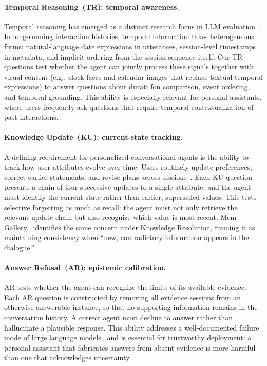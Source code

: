 \documentclass{llmxive}
\begin{document}
\paragraph{Temporal Reasoning~(TR): temporal awareness.}
Temporal reasoning has emerged as a distinct research focus in LLM evaluation~\cite{wang2023cola,wang2022subeventwriter,wei2025time,wu2025longmemevalbenchmarkingchatassistants}. In long-running interaction histories, temporal information takes heterogeneous forms: natural-language date expressions in utterances, session-level timestamps in metadata, and implicit ordering from the session sequence itself. Our TR questions test whether the agent can jointly process these signals together with visual content (e.g., clock faces and calendar images that replace textual temporal expressions) to answer questions about durati fon comparison, event ordering, and temporal grounding. This ability is especially relevant for personal assistants, where users frequently ask questions that require temporal contextualization of past interactions.

\paragraph{Knowledge Update~(KU): current-state tracking.}
A defining requirement for personalized conversational agents is the ability to track how user attributes evolve over time. Users routinely update preferences, correct earlier statements, and revise plans across sessions~\cite{xu2024knowledge}. Each KU question presents a chain of four successive updates to a single attribute, and the agent must identify the current state rather than earlier, superseded values. This tests selective forgetting as much as recall: the agent must not only retrieve the relevant update chain but also recognize which value is most recent. Mem-Gallery~\cite{memgallery} identifies the same concern under Knowledge Resolution, framing it as maintaining consistency when ``new, contradictory information appears in the dialogue.''

\paragraph{Answer Refusal~(AR): epistemic calibration.}
AR tests whether the agent can recognize the limits of its available evidence. Each AR question is constructed by removing all evidence sessions from an otherwise answerable instance, so that no supporting information remains in the conversation history. A correct agent must decline to answer rather than hallucinate a plausible response. This ability addresses a well-documented failure mode of large language models~\cite{zhang2024rtuning} and is essential for trustworthy deployment: a personal assistant that fabricates answers from absent evidence is more harmful than one that acknowledges uncertainty.
\end{document}
